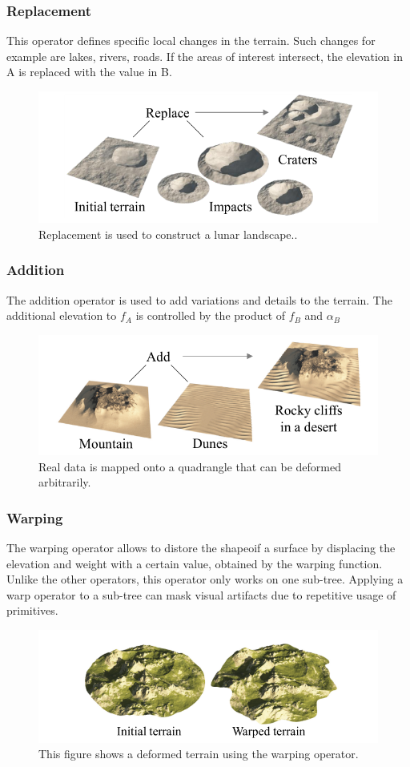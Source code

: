 \subsubsection{Replacement}
This operator defines specific local changes in the terrain. Such changes for example are lakes, rivers, roads. If the areas of interest intersect, the elevation in A is replaced with the value in B. 
\begin{figure}[htb]
	\centering
	\includegraphics[width=.8\linewidth]{CGFCGF12530/replace_operator}
	\caption{Replacement is used to construct a lunar landscape..}
	\label{fig:replace_operator}
\end{figure}
\subsubsection{Addition}
The addition operator is used to add variations and details to the terrain. The additional elevation to $f_A$ is controlled by the product of $f_B$ and $\alpha_B$
\begin{figure}[htb]
	\centering
	\includegraphics[width=.8\linewidth]{CGFCGF12530/addition_operator}
	\caption{Real data is mapped onto a quadrangle that can be deformed arbitrarily.}
	\label{fig:addition_operator}
\end{figure}
\subsubsection{Warping}
The warping operator allows to distore the shapeoif a surface by displacing the elevation and weight with a certain value, obtained by the warping function. Unlike the other operators, this operator only works on one sub-tree. 
Applying a warp operator to a sub-tree can mask visual artifacts due to repetitive usage of primitives. 
\begin{figure}[htb]
	\centering
	\includegraphics[width=.8\linewidth]{CGFCGF12530/warp_operator}
	\caption{This figure shows a deformed terrain using the warping operator.}
	\label{fig:warp_operator}
\end{figure}
